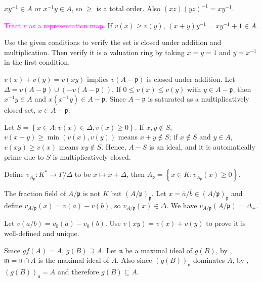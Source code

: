 \begin{exercise}\label{ex5.30}
	$xy^{-1}\in A$ or $x^{-1}y\in A$, so $\geqslant$ is a total order. Also $(xz)(yz)^{-1}=xy^{-1}$.
	
	\textcolor{magenta}{Treat $v$ as a representation map.} If $v(x)\geqslant v(y)$, $(x+y)y^{-1}=xy^{-1}+1\in A$.
\end{exercise}

\begin{exercise}\label{ex5.31}
	Use the given conditions to verify the set is closed under addition and multiplication. Then verify it is a valuation ring by taking $x=y=1$ and $y=x^{-1}$ in the first condition.
\end{exercise}

\begin{exercise}\label{ex5.32}
	$v(x)+v(y)=v(xy)$ implies $v(A-\mathfrak{p})$ is closed under addition. Let $\Delta=v(A-\mathfrak{p})\cup\left(-v(A-\mathfrak{p})\right)$. If $0\leqslant v(x)\leqslant v(y)$ with $y\in A-\mathfrak{p}$, then $x^{-1}y\in A$ and $x\left(x^{-1}y\right)\in A-\mathfrak{p}$. Since $A-\mathfrak{p}$ is saturated as a multiplicatively closed set, $x\in A-\mathfrak{p}$.
	
	Let $S=\left\{x\in A:v(x)\in\Delta,v(x)\geqslant0\right\}$. If $x,y\notin S$, $v(x+y)\geqslant\min\left(v(x),v(y)\right)$ means $x+y\notin S$; if $x\notin S$ and $y\in A$, $v(xy)\geqslant v(x)$ means $xy\notin S$. Hence, $A-S$ is an ideal, and it is automatically prime due to $S$ is multiplicatively closed.
	
	Define $v_{A_\mathfrak{p}}:K^*\rightarrow\Gamma/\Delta$ to be $x\mapsto x+\Delta$, then $A_\mathfrak{p}=\left\{x\in K:v_{A_\mathfrak{p}}(x)\geqslant0\right\}$.
	
	The fraction field of $A/\mathfrak{p}$ is not $K$ but $\left(A/\mathfrak{p}\right)_{\overline{\mathfrak{p}}}$. Let $x=\overline{a}/\overline{b}\in\left(A/\mathfrak{p}\right)_{\overline{\mathfrak{p}}}$ and define $v_{A/\mathfrak{p}}(x)=v(a)-v(b)$, so $v_{A/\mathfrak{p}}(x)\in\Delta$. We have $v_{A/\mathfrak{p}}(A/\mathfrak{p})=\Delta_+$.
\end{exercise}

\begin{exercise}\label{ex5.33}
	Let $v(a/b)=v_0(a)-v_0(b)$. Use $v(xy)=v(x)+v(y)$ to prove it is well-defined and unique.
\end{exercise}

\begin{exercise}\label{ex5.34}
	Since $gf(A)=A$, $g(B)\supseteq A$. Let $\mathfrak{n}$ be a maximal ideal of $g(B)$, by , $\mathfrak{m}=\mathfrak{n}\cap A$ is the maximal ideal of $A$. Also since $\left(g(B)\right)_\mathfrak{n}$ dominates $A$, by , $\left(g(B)\right)_\mathfrak{n}=A$ and therefore $g(B)\subseteq A$.
\end{exercise}

